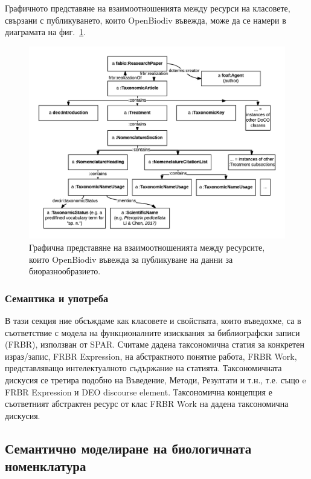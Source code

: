 Графичното представяне на взаимоотношенията между ресурси на класовете, свързани с публикуването, които OpenBiodiv въвежда, може да се намери в диаграмата на фиг.~\ref{taxonomic-article-diagram}.

\begin{figure}[h!]
	\centering
	\includegraphics[width=\textwidth]{Figures/taxonomic-article-diagram}
	\decoRule
  \caption[Taxonomic article diagram.]{Графична представяне на взаимоотношенията между ресурсите, които OpenBiodiv въвежда за публикуване на данни за биоразнообразието.}
  \label{taxonomic-article-diagram}
\end{figure}

\subsubsection{Семантика и употреба}

В тази секция ние обсъждаме как класовете и свойствата, които въведохме, са в съответствие с модела на функционалните изисквания за библиографски записи (FRBR), използван от SPAR. Считаме дадена таксономична статия за конкретен израз/запис, FRBR Expression, на абстрактното понятие работа, FRBR Work, представляващо интелектуалното съдържание на статията. Таксономичната дискусия се третира подобно на Въведение, Методи, Резултати и т.н., т.е. също e FRBR Expression и DEO discourse element. Таксономична концепция е съответният абстрактен ресурс от клас FRBR Work на дадена таксономична дискусия. 

\subsection{Семантично моделиране на биологичната номенклатура}

